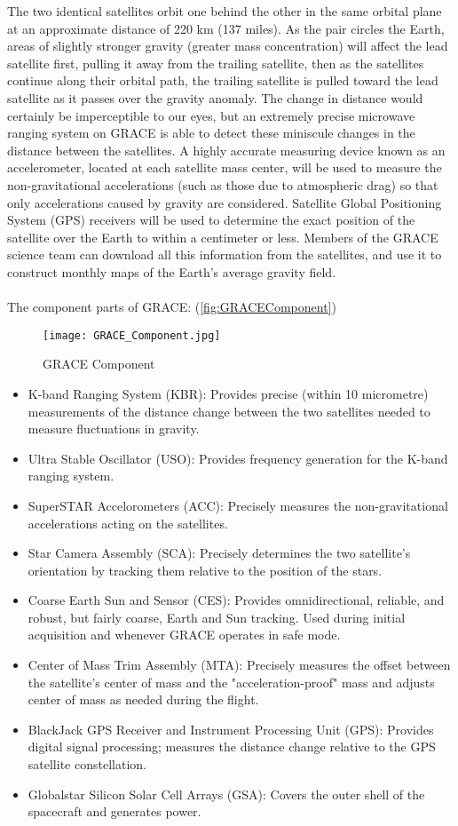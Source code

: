 The two identical satellites orbit one behind the other in the same orbital plane at an approximate distance of 220 km (137 miles). As the pair circles the Earth, areas of slightly stronger gravity (greater mass concentration) will affect the lead satellite first, pulling it away from the trailing satellite, then as the satellites continue along their orbital path, the trailing satellite is pulled toward the lead satellite as it passes over the gravity anomaly. The change in distance would certainly be imperceptible to our eyes, but an extremely precise microwave ranging system on GRACE is able to detect these miniscule changes in the distance between the satellites. A highly accurate measuring device known as an accelerometer, located at each satellite mass center, will be used to measure the non-gravitational accelerations (such as those due to atmospheric drag) so that only accelerations caused by gravity are considered. Satellite Global Positioning System (GPS) receivers will be used to determine the exact position of the satellite over the Earth to within a centimeter or less. Members of the GRACE science team can download all this information from the satellites, and use it to construct monthly maps of the Earth's average gravity field. \\\\
The component parts of GRACE: (\autoref{fig:GRACEComponent}) \cite{gracecomponent}
\begin{figure}[htbp]
	\centering
	\texttt{[image: GRACE\_Component.jpg]} 
	\caption{GRACE Component \cite{gracecomponent}} 
	\label{fig:GRACEComponent}
\end{figure}
\begin{itemize}
	\item K-band Ranging System (KBR): Provides precise (within 10 micrometre) measurements of the distance change between the two satellites needed to measure fluctuations in gravity.
	\item Ultra Stable Oscillator (USO): Provides frequency generation for the K-band ranging system.
	\item SuperSTAR Accelorometers (ACC): Precisely measures the non-gravitational accelerations acting on the satellites.
	\item Star Camera Assembly (SCA): Precisely determines the two satellite's orientation by tracking them relative to the position of the stars.
	\item Coarse Earth Sun and Sensor (CES): Provides omnidirectional, reliable, and robust, but fairly coarse, Earth and Sun tracking. Used during initial acquisition and whenever GRACE operates in safe mode.
	\item Center of Mass Trim Assembly (MTA): Precisely measures the offset between the satellite's center of mass and the "acceleration-proof" mass and adjusts center of mass as needed during the flight.
	\item BlackJack GPS Receiver and Instrument Processing Unit (GPS): 	Provides digital signal processing; measures the distance change relative to the GPS satellite constellation.
	\item Globalstar Silicon Solar Cell Arrays (GSA): Covers the outer shell of the spacecraft and generates power.
\end{itemize}
